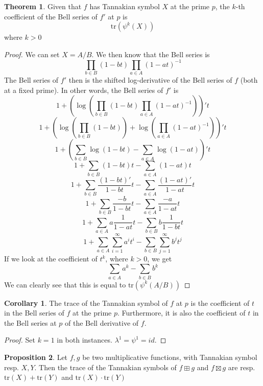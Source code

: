 \documentclass[a4paper]{article}
\theoremstyle{definition}
\newtheorem{theorem}{Theorem}[section]
\newtheorem{proposition}[theorem]{Proposition}
\newtheorem*{corollary}{Corollary}
\theoremstyle{remark}
\newcommand{\tr}{\mathrm{tr}}
\begin{document}
\begin{theorem}
Given that $f$ has Tannakian symbol $X$ at the prime $p$, the $k$-th coefficient of the Bell series of $f'$ at $p$ is
$$\tr\left(\psi^k\left(X\right)\right)$$
where $k > 0$
\end{theorem}

\begin{proof}
We can set $X = A/B$. We then know that the Bell series is
$$\prod_{b \in B}\left(1 - bt\right)\prod_{a \in A}\left(1 - at\right)^{-1}$$
The Bell series of $f'$ then is the shifted log-derivative of the Bell series of $f$ (both at a fixed prime). In other words, the Bell series of $f'$ is
$$1 + \left(\log\left(\prod_{b \in B}\left(1 - bt\right)\prod_{a \in A}\left(1 - at\right)^{-1}\right)\right)'t$$
$$1 + \left(\log\left(\prod_{b \in B}\left(1 - bt\right)\right) + \log\left(\prod_{a \in A}\left(1 - at\right)^{-1}\right)\right)'t$$
$$1 + \left(\sum_{b \in B}\log\left(1 - bt\right) - \sum_{a \in A}\log\left(1 - at\right)\right)'t$$
$$1 + \sum_{b \in B}\left(1 - bt\right)t - \sum_{a \in A}\left(1 - at\right)t$$
$$1 + \sum_{b \in B}\frac{(1 - bt)'}{1 - bt}t - \sum_{a \in A}\frac{(1 - at)'}{1 - at} t$$
$$1 + \sum_{b \in B}\frac{ -b}{1 - bt}t - \sum_{a \in A}\frac{ -a }{1 - at} t$$
$$1 + \sum_{a \in A}a\frac{ 1 }{1 - at} t - \sum_{b \in B}b\frac{ 1}{1 - bt}t$$
$$1 + \sum_{a \in A}\sum_{i=1}^\infty a^it^i- \sum_{b \in B}\sum_{j=1}^\infty b^jt^j$$
If we look at the coefficient of $t^k$, where $k > 0$, we get
$$\sum_{a \in A} a^k - \sum_{b \in B} b^k$$
We can clearly see that this is equal to $\tr(\psi^k(A/B))$
\end{proof}

\begin{corollary}
The trace of the Tannakian symbol of $f$ at $p$ is the coefficient of $t$ in the Bell series of $f$ at the prime $p$. Furthermore, it is also the coefficient of $t$ in the Bell series at $p$ of the Bell derivative of $f$.
\end{corollary}

\begin{proof}
Set $k = 1$ in both instances. $\lambda^1 = \psi^1 = id$.
\end{proof}

\begin{proposition}
Let $f, g$ be two multiplicative functions, with Tannakian symbol resp. $X, Y$. Then the trace of the Tannakian symbols of $f \boxplus g$ and $f \boxtimes g$ are resp. $\tr(X) + \tr(Y)$ and $\tr(X) \cdot \tr(Y)$
\end{proposition}
\end{document}
